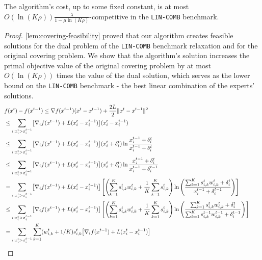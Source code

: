 \begin{theorem} \label{covering-theorem}
The algorithm's cost, up to some fixed constant, is at most $O(\ln(K \rho)) \frac{\lambda}{1 - \mu \ln (K\rho)}$-competitive in the \texttt{LIN-COMB} benchmark.
\end{theorem}
%
\begin{proof} \cref{lem:covering-feasibility} proved that our algorithm creates feasible solutions for the dual problem of the \texttt{LIN-COMB} benchmark relaxation and for the original covering problem. We show that the algorithm's solution increases the primal objective value of the original covering problem by at most $O(\ln(K \rho))$ times the value of the dual solution, which serves as the lower bound on the \texttt{LIN-COMB} benchmark - the best linear combination of the experts' solutions.
\begin{align}
&f(x^{t}) - f(x^{t-1}) \leq \nabla f(x^{t-1}) (x^{t} - x^{t-1}) + \frac{2L}{2} \|x^{t} - x^{t-1} \|^{2} \\
%
&\leq \sum_{i: x_{i}^{t} > x_{i}^{t-1}} \bigl[ \nabla_{i} f(x^{t-1}) + L(x_{i}^{t} - x_{i}^{t-1}) \bigr] (x_{i}^{t} - x_{i}^{t-1}) &&  \notag \\
%
&\leq \sum_{i: x_{i}^{t} > x_{i}^{t-1}} \bigl[ \nabla_{i} f(x^{t-1}) + L(x_{i}^{t} - x_{i}^{t-1}) \bigr](x_{i}^{t} + \delta_{i}^{t}) \ln \frac{x_{i}^{t-1} + \delta_{i}^{t}}{x_{i}^{t-1} + \delta_{i}^{t}} \\
%
&\leq \sum_{i: x_{i}^{t} > x_{i}^{t-1}} \bigl[ \nabla_{i} f(x^{t-1}) + L(x_{i}^{t} - x_{i}^{t-1}) \bigr] (x_{i}^{t} + \delta_{i}^{t}) \ln \frac{x_{i}^{t-1} + \delta_{i}^{t}}{x_{i}^{t-1} + \delta_{i}^{t-1}} \\
%
&= \sum_{i: x_{i}^{t} > x_{i}^{t-1}} \bigl[ \nabla_{i} f(x^{t-1}) + L(x_{i}^{t} - x_{i}^{t-1}) \bigr] \left[ \left(\sum_{k=1}^{K}  s_{i,k}^{t} w_{i,k}^{t} + \frac{1}{K} \sum_{k=1}^{K} s_{i,k}^{t} \right)
            \ln \left(\frac{ \sum_{k=1}^{K}  s_{i,k}^{t} w_{i,k}^{t} + \delta_{i}^{t}}{x_{i}^{t-1} + \delta_{i}^{t-1}}  \right) \right]\\
%
&\leq \sum_{i: x_{i}^{t} > x_{i}^{t-1}} \bigl[ \nabla_{i} f(x^{t-1}) + L(x_{i}^{t} - x_{i}^{t-1}) \bigr] \left[ \left(\sum_{k=1}^{K}  s_{i,k}^{t} w_{i,k}^{t} + \frac{1}{K} \sum_{k=1}^{K} s_{i,k}^{t} \right)
            \ln \left(\frac{ \sum_{k=1}^{K}  s_{i,k}^{t} w_{i,k}^{t} + \delta_{i}^{t}}{\sum_{k=1}^{K}  s_{i,k}^{t-1} w_{i,k}^{t-1} + \delta_{i}^{t-1}}  \right) \right]\\
%
&= \sum_{i: x_{i}^{t} > x_{i}^{t-1}} \sum_{k=1}^{K} (w_{i,k}^{t} + 1/K) s_{i,k}^{t} \bigl[ \nabla_{i} f(x^{t-1}) + L(x_{i}^{t} - x_{i}^{t-1}) \bigr]

\end{align}
\end{proof}

